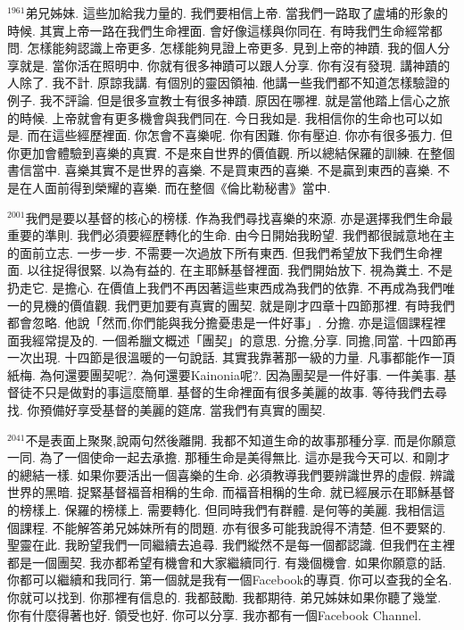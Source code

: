 \documentclass{book}
\begin{document}
$^{1961}$弟兄姊妹.
這些加給我力量的.
我們要相信上帝.
當我們一路取了盧埔的形象的時候.
其實上帝一路在我們生命裡面.
會好像這樣與你同在.
有時我們生命經常都問.
怎樣能夠認識上帝更多.
怎樣能夠見證上帝更多.
見到上帝的神蹟.
我的個人分享就是.
當你活在照明中.
你就有很多神蹟可以跟人分享.
你有沒有發現.
講神蹟的人除了.
我不計.
原諒我講.
有個別的靈因領袖.
他講一些我們都不知道怎樣驗證的例子.
我不評論.
但是很多宣教士有很多神蹟.
原因在哪裡.
就是當他踏上信心之旅的時候.
上帝就會有更多機會與我們同在.
今日我如是.
我相信你的生命也可以如是.
而在這些經歷裡面.
你怎會不喜樂呢.
你有困難.
你有壓迫.
你亦有很多張力.
但你更加會體驗到喜樂的真實.
不是來自世界的價值觀.
所以總結保羅的訓練.
在整個書信當中.
喜樂其實不是世界的喜樂.
不是買東西的喜樂.
不是贏到東西的喜樂.
不是在人面前得到榮耀的喜樂.
而在整個《倫比勒秘書》當中.

$^{2001}$我們是要以基督的核心的榜樣.
作為我們尋找喜樂的來源.
亦是選擇我們生命最重要的準則.
我們必須要經歷轉化的生命.
由今日開始我盼望.
我們都很誠意地在主的面前立志.
一步一步.
不需要一次過放下所有東西.
但我們希望放下我們生命裡面.
以往捉得很緊.
以為有益的.
在主耶穌基督裡面.
我們開始放下.
視為糞土.
不是扔走它.
是擔心.
在價值上我們不再因著這些東西成為我們的依靠.
不再成為我們唯一的見機的價值觀.
我們更加要有真實的團契.
就是剛才四章十四節那裡.
有時我們都會忽略.
他說「然而,你們能與我分擔憂患是一件好事」.
分擔.
亦是這個課程裡面我經常提及的.
一個希臘文概述「團契」的意思.
分擔,分享.
同擔,同當.
十四節再一次出現.
十四節是很溫暖的一句說話.
其實我靠著那一級的力量.
凡事都能作一頂紙梅.
為何還要團契呢?.
為何還要Kainonia呢?.
因為團契是一件好事.
一件美事.
基督徒不只是做對的事這麼簡單.
基督的生命裡面有很多美麗的故事.
等待我們去尋找.
你預備好享受基督的美麗的筵席.
當我們有真實的團契.

$^{2041}$不是表面上聚聚,說兩句然後離開.
我都不知道生命的故事那種分享.
而是你願意一同.
為了一個使命一起去承擔.
那種生命是美得無比.
這亦是我今天可以.
和剛才的總結一樣.
如果你要活出一個喜樂的生命.
必須教導我們要辨識世界的虛假.
辨識世界的黑暗.
捉緊基督福音相稱的生命.
而福音相稱的生命.
就已經展示在耶穌基督的榜樣上.
保羅的榜樣上.
需要轉化.
但同時我們有群體.
是何等的美麗.
我相信這個課程.
不能解答弟兄姊妹所有的問題.
亦有很多可能我說得不清楚.
但不要緊的.
聖靈在此.
我盼望我們一同繼續去追尋.
我們縱然不是每一個都認識.
但我們在主裡都是一個團契.
我亦都希望有機會和大家繼續同行.
有幾個機會.
如果你願意的話.
你都可以繼續和我同行.
第一個就是我有一個Facebook的專頁.
你可以查我的全名.
你就可以找到.
你那裡有信息的.
我都鼓勵.
我都期待.
弟兄姊妹如果你聽了幾堂.
你有什麼得著也好.
領受也好.
你可以分享.
我亦都有一個Facebook Channel.
\end{document}
